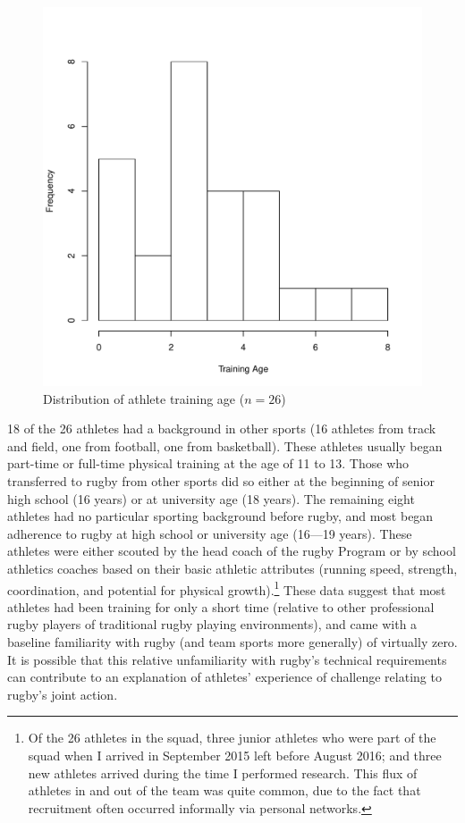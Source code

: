 \begin{CJK}{UTF8}{gbsn}
      \begin{figure}[!htbp]
        \centering
          \includegraphics[scale=.3]{images/ethnoTrainingAgeHist}
            \caption{Distribution of athlete training age ($n = 26$)}
         \label{fig:ethnoTrainingAgeHist}
      \end{figure}


18 of the 26 athletes had a background in other sports (16 athletes from track and field, one from football, one from basketball).  These athletes usually began part-time or full-time physical training at the age of 11 to 13.  Those who transferred to rugby from other sports did so either at the beginning of senior high school (16 years) or at university age (18 years).  The remaining eight athletes had no particular sporting background before rugby, and most began adherence to rugby at high school or university age (16---19 years).  These athletes were either scouted by the head coach of the rugby Program or by school athletics coaches based on their basic athletic attributes (running speed, strength, coordination, and potential for physical growth).\footnote{Of the 26 athletes in the squad, three junior athletes who were part of the squad when I arrived in September 2015 left before August 2016; and three new athletes arrived during the time I performed research.  This flux of athletes in and out of the team was quite common, due to the fact that recruitment often occurred informally via personal networks.}
These data suggest that most athletes had been training for only a short time (relative to other professional rugby players of traditional rugby playing environments), and came with a baseline familiarity with rugby (and team sports more generally) of virtually zero.  It is possible that this relative unfamiliarity with rugby's technical requirements can contribute to an explanation of athletes' experience of challenge relating to rugby's joint action.


\end{CJK}
